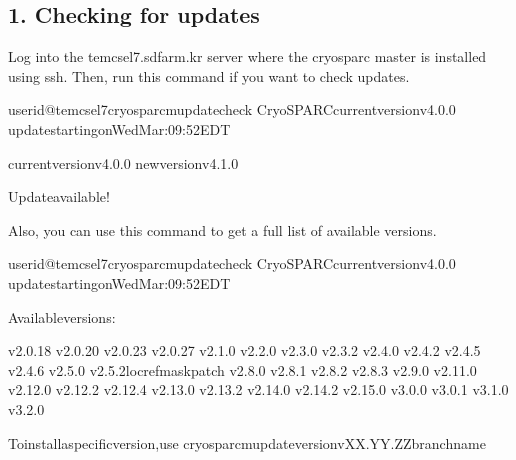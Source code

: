 \documentclass[a4paper,11pt,english]{sphinxmanual}
\begin{document}
\subsection{1. Checking for updates}
\label{\detokenize{faq:checking-for-updates}}
\sphinxAtStartPar
Log into the tem\sphinxhyphen{}cs\sphinxhyphen{}el7.sdfarm.kr server where the cryosparc master is installed using ssh. Then, run this command if you want to check updates.

\begin{sphinxVerbatim}[commandchars=\\\{\}]
userid@tem\PYGZhy{}cs\PYGZhy{}el7\PYGZdl{}\PYGZgt{}cryosparcmupdate\PYGZhy{}\PYGZhy{}check
CryoSPARCcurrentversionv4.0.0
updatestartingonWedMar:09:52EDT

currentversionv4.0.0
newversionv4.1.0

Updateavailable!
\end{sphinxVerbatim}

\sphinxAtStartPar
Also, you can use this command  to get a full list of available versions.

\begin{sphinxVerbatim}[commandchars=\\\{\}]
userid@tem\PYGZhy{}cs\PYGZhy{}el7\PYGZdl{}\PYGZgt{}cryosparcmupdate\PYGZhy{}\PYGZhy{}check
CryoSPARCcurrentversionv4.0.0
updatestartingonWedMar:09:52EDT

Availableversions:

v2.0.18
v2.0.20
v2.0.23
v2.0.27
v2.1.0
v2.2.0
v2.3.0
v2.3.2
v2.4.0
v2.4.2
v2.4.5
v2.4.6
v2.5.0
v2.5.2\PYGZhy{}locref\PYGZhy{}mask\PYGZhy{}patch
v2.8.0
v2.8.1
v2.8.2
v2.8.3
v2.9.0
v2.11.0
v2.12.0
v2.12.2
v2.12.4
v2.13.0
v2.13.2
v2.14.0
v2.14.2
v2.15.0
v3.0.0
v3.0.1
v3.1.0
v3.2.0

Toinstallaspecificversion,use
\PYGZdl{}cryosparcmupdate\PYGZhy{}\PYGZhy{}versionvXX.YY.ZZ\PYG{o}{[}\PYGZhy{}branchname\PYG{o}{]}
\end{sphinxVerbatim}
\end{document}
